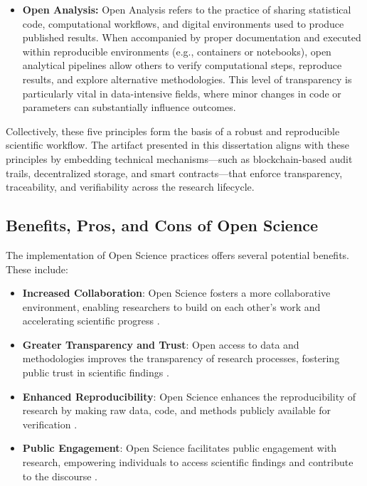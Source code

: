 \documentclass[final]{rc-book-2.14}
\begin{document}
\begin{itemize}
    \item \textbf{Open Analysis:} Open Analysis refers to the practice of sharing statistical code, computational workflows, and digital environments used to produce published results. When accompanied by proper documentation and executed within reproducible environments (e.g., containers or notebooks), open analytical pipelines allow others to verify computational steps, reproduce results, and explore alternative methodologies. This level of transparency is particularly vital in data-intensive fields, where minor changes in code or parameters can substantially influence outcomes.

\end{itemize}

Collectively, these five principles form the basis of a robust and reproducible scientific workflow. The artifact presented in this dissertation aligns with these principles by embedding technical mechanisms—such as blockchain-based audit trails, decentralized storage, and smart contracts—that enforce transparency, traceability, and verifiability across the research lifecycle.


\subsection{Benefits, Pros, and Cons of Open Science}

The implementation of Open Science practices offers several potential benefits. These include:

\begin{itemize}
    \item \textbf{Increased Collaboration}: Open Science fosters a more collaborative environment, enabling researchers to build on each other's work and accelerating scientific progress \cite{Borgman2012}.
    \item \textbf{Greater Transparency and Trust}: Open access to data and methodologies improves the transparency of research processes, fostering public trust in scientific findings \cite{Boulton2015}.
    \item \textbf{Enhanced Reproducibility}: Open Science enhances the reproducibility of research by making raw data, code, and methods publicly available for verification \cite{Nosek2015}.
    \item \textbf{Public Engagement}: Open Science facilitates public engagement with research, empowering individuals to access scientific findings and contribute to the discourse \cite{Leonelli2016}.
\end{itemize}
\end{document}
